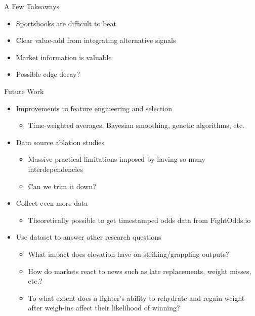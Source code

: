 \documentclass[aspectratio=169,xcolor=dvipsnames]{beamer}
\begin{document}

\begin{frame}{A Few Takeaways}
    \begin{itemize}
        \item Sportsbooks are difficult to beat
    
        \item Clear value-add from integrating alternative signals

        \item Market information is valuable

        \item Possible edge decay?
    \end{itemize}
\end{frame}


\begin{frame}{Future Work}
    \begin{itemize}
        \item Improvements to feature engineering and selection
        \begin{itemize}
            \item Time-weighted averages, Bayesian smoothing, genetic algorithms, etc.
        \end{itemize}

        \item Data source ablation studies
        \begin{itemize}
            \item Massive practical limitations imposed by having so many interdependencies
            \item Can we trim it down?
        \end{itemize}

        \item Collect even more data
        \begin{itemize}
            \item Theoretically possible to get timestamped odds data from FightOdds.io
        \end{itemize}

        \item Use dataset to answer other research questions
        \begin{itemize}
            \item What impact does elevation have on striking/grappling outputs?

            \item How do markets react to news such as late replacements, weight misses, etc.?

            \item To what extent does a fighter's ability to rehydrate and regain weight after weigh-ins affect their likelihood of winning?
        \end{itemize}
    \end{itemize}
\end{frame}
\end{document}
